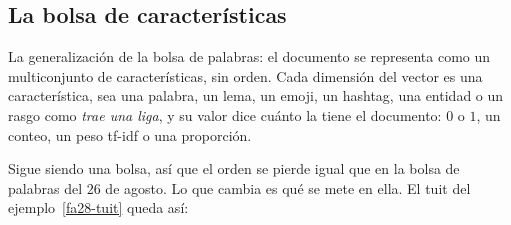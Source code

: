\documentclass[11pt,letterpaper]{article}
\begin{document}
\subsection*{La bolsa de características}

\begin{definicion}
    La generalización de la bolsa de palabras: el documento se
    representa como un multiconjunto de características, sin orden.
    Cada dimensión del vector es una característica, sea una palabra,
    un lema, un emoji, un hashtag, una entidad o un rasgo como
    \textit{trae una liga}, y su valor dice cuánto la tiene el
    documento: $0$ o $1$, un conteo, un peso tf-idf o una proporción.
\end{definicion}

Sigue siendo una bolsa, así que el orden se pierde igual que en la
bolsa de palabras del $26$ de agosto. Lo que cambia es qué se mete en
ella. El tuit del ejemplo~\ref{fa28-tuit} queda así:
\end{document}
